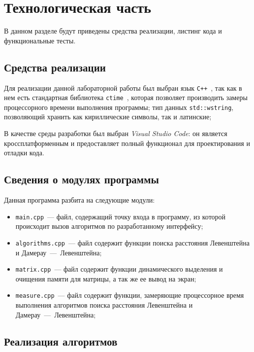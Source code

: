 \chapter{Технологическая часть}

В данном разделе будут приведены средства реализации, листинг кода и функциональные тесты.

\section{Средства реализации}

Для реализации данной лабораторной работы был выбран язык \texttt{C++}~\cite{cpp-lang}, так как в нем есть стандартная библиотека \texttt{ctime}~\cite{cpp-lang-time}, которая позволяет производить замеры процессорного времени выполнения программы; тип данных \texttt{std::wstring}, позволяющий хранить как кириллические символы, так и латинские;

В качестве среды разработки был выбран \textit{Visual Studio Code}: он является кроссплатформенным и предоставляет полный функционал для проектирования и отладки кода.
 
\section{Сведения о модулях программы}

Данная программа разбита на следующие модули:

\begin{itemize}
	\item \texttt{main.cpp}~--- файл, содержащий точку входа в программу, из которой происходит вызов алгоритмов по разработанному интерфейсу;
	\item \texttt{algorithms.cpp}~--- файл содержит функции поиска расстояния Левенштейна и Дамерау~---~Левенштейна;
	\item \texttt{matrix.cpp}~--- файл содержит функции динамического выделения и очищения памяти для матрицы, а так же ее вывод на экран;
	\item \texttt{measure.cpp}~--- файл содержит функции, замеряющие процессорное время выполнения алгоритмов поиска расстояния Левенштейна и Дамерау~---~Левенштейна;
\end{itemize}

\section{Реализация алгоритмов}

